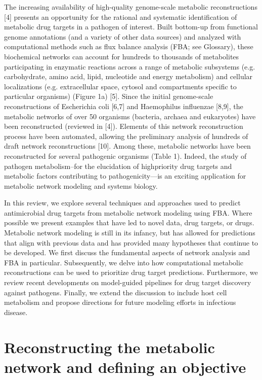 The increasing availability of high-quality genome-scale 
metabolic reconstructions [4] presents an opportunity for the 
rational and systematic identification of metabolic drug 
targets in a pathogen of interest. Built bottom-up from functional 
genome annotations (and a variety of other data sources) and 
analyzed with computational methods such as flux balance analysis 
(FBA; see Glossary), these biochemical networks can account 
for hundreds to thousands of metabolites participating in enzymatic 
reactions across a range of metabolic subsystems (e.g. carbohydrate, 
amino acid, lipid, nucleotide and energy metabolism) and cellular 
localizations (e.g. extracellular space, cytosol and compartments 
specific to particular organisms) (Figure 1a) [5]. Since the 
initial genome-scale reconstructions of Escherichia coli [6,7] 
and Haemophilus influenzae [8,9], the metabolic networks of over 
50 organisms (bacteria, archaea and eukaryotes) have been 
reconstructed (reviewed in [4]). Elements of this network 
reconstruction process have been automated, allowing the preliminary 
analysis of hundreds of draft network reconstructions [10]. Among 
these, metabolic networks have been reconstructed for several pathogenic 
organisms (Table 1). Indeed, the study of pathogen metabolism–for the 
elucidation of highpriority drug targets and metabolic factors 
contributing to pathogenicity—is an exciting application for 
metabolic network modeling and systems biology.

In this review, we explore several techniques and approaches 
used to predict antimicrobial drug targets from metabolic network 
modeling using FBA. Where possible we present examples that have 
led to novel data, drug targets, or drugs. Metabolic network 
modeling is still in its infancy, but has allowed for predictions 
that align with previous data and has provided many hypotheses 
that continue to be developed. We first discuss the fundamental 
aspects of network analysis and FBA in particular. Subsequently, 
we delve into how computational metabolic reconstructions can be 
used to prioritize drug target predictions. Furthermore, we 
review recent developments on model-guided pipelines for drug 
target discovery against pathogens. Finally, we extend the discussion 
to include host cell metabolism and propose directions for future 
modeling efforts in infectious disease.

\section{Reconstructing the metabolic network and defining an objective}

